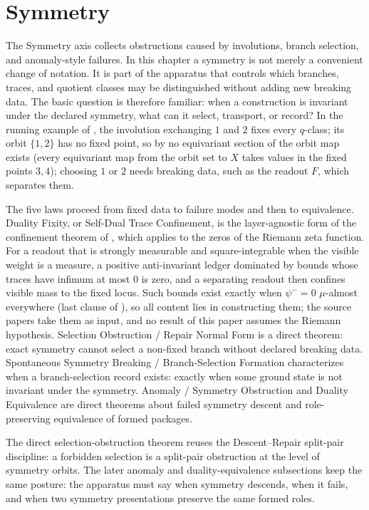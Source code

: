 \section{Symmetry}\label{sec:symmetry}

The Symmetry axis collects obstructions caused by involutions,
branch selection, and anomaly-style failures.  In this chapter a
symmetry is not merely a convenient change of notation.  It is part
of the apparatus that controls which branches, traces, and quotient
classes may be distinguished without adding new breaking data.  The
basic question is therefore familiar: when a construction is
invariant under the declared symmetry, what can it select, transport,
or record?  In the running example of , the involution
exchanging \(1\) and \(2\) fixes every \(q\)-class; its orbit \(\{1,2\}\) has no fixed point, so by  no equivariant section of the orbit map exists (every equivariant map from the orbit set to \(X\) takes values in the fixed points \(3,4\)); choosing \(1\) or \(2\) needs breaking data, such as the readout \(F\), which separates them.

The five laws proceed from fixed data to failure modes and then to
equivalence.  Duality Fixity, or Self-Dual Trace Confinement, is the
layer-agnostic form of the confinement theorem of
\citet{Tsiokos2026SDTC}, which \citet{Tsiokos2026RH} applies to the
zeros of the Riemann zeta function.  For a readout that is strongly
measurable and square-integrable when the visible weight is a measure,
a positive anti-invariant ledger dominated by bounds whose traces have
infimum at most \(0\) is zero, and a separating readout then confines
visible mass to the fixed locus.  Such bounds exist exactly when
\(\psi^-=0\) \(\mu\)-almost everywhere (last clause of ),
so all content lies in constructing them; the source papers take them
as input, and no result of this paper assumes the Riemann hypothesis.  Selection Obstruction / Repair
Normal Form is a direct theorem: exact symmetry cannot select a
non-fixed branch without declared breaking data.  Spontaneous
Symmetry Breaking / Branch-Selection Formation characterizes when a
branch-selection record exists: exactly when some ground state is not invariant
under the symmetry.  Anomaly / Symmetry Obstruction and Duality
Equivalence are direct theorems about failed symmetry descent and
role-preserving equivalence of formed packages.

The direct selection-obstruction theorem reuses the
Descent--Repair split-pair discipline: a forbidden selection is a
split-pair obstruction at the level of symmetry orbits.  The later
anomaly and duality-equivalence subsections keep the same posture:
the apparatus must say when symmetry descends, when it fails, and
when two symmetry presentations preserve the same formed roles.

